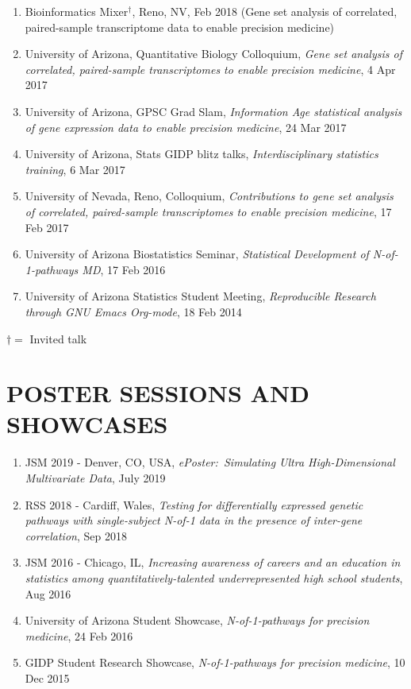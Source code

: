 \documentclass[paper=a4,fontsize=11pt]{scrartcl} %
\newcommand{\NewPart}[2]{\section*{\uppercase{#1} #2 }}
\newcommand{\TalkEntry}[4]{
		\noindent #1, #2, #3 #4}
\begin{document}
\begin{enumerate}
\item\TalkEntry{Bioinformatics Mixer$^{\dagger}$}{Reno, NV}{Feb 2018}{(Gene set analysis of correlated, paired-sample transcriptome data to enable precision medicine)}
  
\item\TalkEntry{University of Arizona, Quantitative Biology Colloquium}{\textit{Gene set analysis of correlated, paired-sample transcriptomes to enable precision medicine}}{4 Apr 2017}{}  
  \item\TalkEntry{University of Arizona, GPSC Grad Slam}{\textit{Information Age statistical analysis of gene expression data to enable precision medicine}}{24 Mar 2017}{}
\item\TalkEntry{University of Arizona, Stats GIDP blitz talks}{\textit{Interdisciplinary statistics training}}{6 Mar 2017}{}

\item\TalkEntry{University of Nevada, Reno, Colloquium}{\textit{Contributions to gene set analysis of correlated, paired-sample transcriptomes to enable precision medicine}}{17 Feb 2017}{}

\item\TalkEntry{University of Arizona Biostatistics Seminar}{\textit{Statistical Development of N-of-1-pathways MD}}{17 Feb 2016}{}
\item\TalkEntry{University of Arizona Statistics Student Meeting}{\textit{Reproducible Research through GNU Emacs Org-mode}}{18 Feb 2014}{}
\vspace{-7pt}
\end{enumerate}
$\dagger=$ Invited talk

\NewPart{Poster sessions and Showcases}{}
\vspace{-7pt}
\begin{enumerate}
    \item\TalkEntry{JSM 2019 - Denver, CO, USA}{\textit{ePoster:~Simulating Ultra High-Dimensional Multivariate Data}}{July 2019}{}
  \item\TalkEntry{RSS 2018 - Cardiff, Wales}{\textit{Testing for differentially expressed genetic pathways with single-subject N-of-1 data in the presence of inter-gene correlation}}{Sep 2018}{}
\item\TalkEntry{JSM 2016 - Chicago, IL}{\textit{Increasing awareness of careers and an education in statistics among quantitatively-talented underrepresented high school students}}{Aug 2016}{}
\item\TalkEntry{University of Arizona Student Showcase}{\textit{N-of-1-pathways for precision medicine}}{24 Feb 2016}{}
\item\TalkEntry{GIDP Student Research Showcase}{\textit{N-of-1-pathways for precision medicine}}{10 Dec 2015}{}
\vspace{-7pt}
\end{enumerate}
\end{document}
